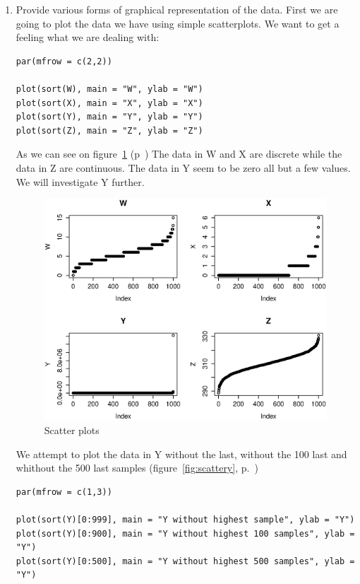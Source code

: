\documentclass{article}
\begin{document}
\begin{enumerate}
  \item Provide various forms of graphical representation of the data.
  First we are going to plot the data we have using simple scatterplots. We want
  to get a feeling what we are dealing with:
  \begin{lstlisting}
par(mfrow = c(2,2))
  
plot(sort(W), main = "W", ylab = "W")
plot(sort(X), main = "X", ylab = "X")
plot(sort(Y), main = "Y", ylab = "Y")
plot(sort(Z), main = "Z", ylab = "Z")
  \end{lstlisting}
  
  As we can see on figure~\ref{fig:scatterplots} (p~\pageref{fig:scatterplots})
  The data in W and X are discrete while the data in Z are continuous. The data
  in Y seem to be zero all but a few values. We will investigate Y further.
  
  \begin{figure}[H]
  \centering
  \includegraphics[scale=0.6]{scatterplots.eps}
  \caption{Scatter plots}
  \label{fig:scatterplots}
  \end{figure}
  
  We attempt to plot the data in Y without the last, without the 100 last and
  whithout the 500 last samples (figure~\ref{fig:scattery},
  p.~\pageref{fig:scattery})
  
  \begin{lstlisting}
par(mfrow = c(1,3))

plot(sort(Y)[0:999], main = "Y without highest sample", ylab = "Y")
plot(sort(Y)[0:900], main = "Y without highest 100 samples", ylab = "Y")
plot(sort(Y)[0:500], main = "Y without highest 500 samples", ylab = "Y")
  \end{lstlisting}
  

\end{enumerate}
\end{document}

